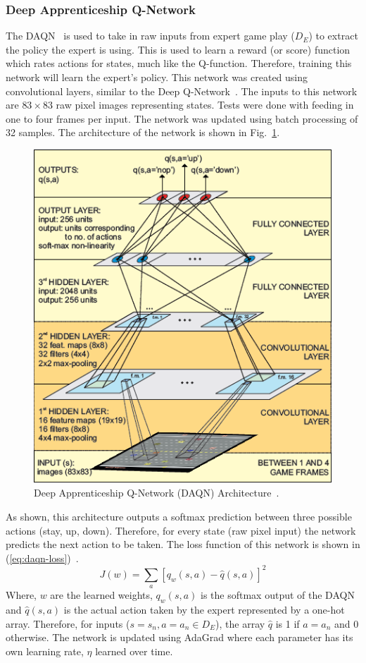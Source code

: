 \documentclass[12pt,american]{report}
\begin{document}
\subsubsection{Deep Apprenticeship Q-Network}
The DAQN~\cite{markovikj2014deep} is used to take in raw inputs from expert game play ($D_E$) to extract the policy the expert is using.  This is used to learn a reward (or score) function which rates actions for states, much like the Q-function. Therefore, training this network will learn the expert's policy. This network was created using convolutional layers, similar to the Deep Q-Network~\cite{atari}. The inputs to this network are $83\times 83$ raw pixel images representing states.  Tests were done with feeding in one to four frames per input. The network was updated using batch processing of 32 samples. The architecture of the network is shown in Fig.~\ref{fig:daqn-dal}.
\begin{figure}
\centering
\includegraphics[scale=1.5]{images/daqn-dal.png}
\caption{Deep Apprenticeship Q-Network (DAQN) Architecture~\cite{markovikj2014deep}.}
\label{fig:daqn-dal}
\end{figure}
As shown, this architecture outputs a softmax prediction between three possible actions (stay, up, down).  Therefore, for every state (raw pixel input) the network predicts the next action to be taken. The loss function of this network is shown in (\ref{eq:daqn-loss})~\cite{markovikj2014deep}.
\begin{equation}
     \label{eq:daqn-loss}
     J(w) =\sum_{a}[q_w(s,a)-\hat{q}(s,a)]^2%
\end{equation}
Where, $w$ are the learned weights, $q_w(s,a)$ is the softmax output of the DAQN and $\hat{q}(s,a)$ is the actual action taken by the expert represented by a one-hot array.  Therefore, for inputs ($s=s_n,a=a_n \in D_E$), the array $\hat{q}$ is 1 if $a = a_n$ and 0 otherwise. The network is updated using AdaGrad where each parameter has its own learning rate, $\eta$ learned over time.
\end{document}
